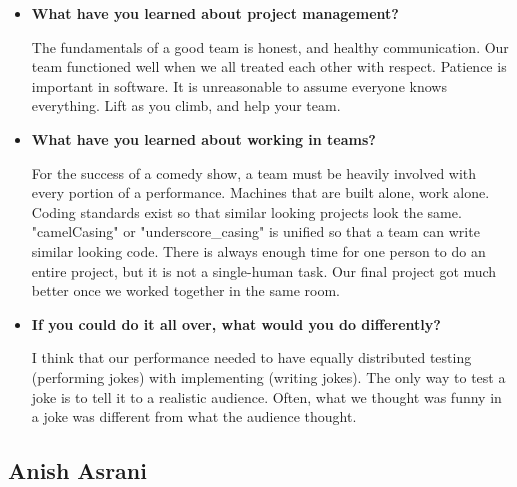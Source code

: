 \documentclass[onecolumn, draftclsnofoot,10pt, compsoc]{IEEEtran}
\begin{document}
\begin{itemize}
\item{\textbf{What have you learned about project management?}}

    The fundamentals of a good team is honest, and healthy communication.
    Our team functioned well when we all treated each other with respect.
    Patience is important in software. It is unreasonable to assume everyone knows everything.
    Lift as you climb, and help your team.


\item{\textbf{What have you learned about working in teams?}}

        For the success of a comedy show, a team must be heavily involved with every portion of a performance.
        Machines that are built alone, work alone. Coding standards exist so that similar looking projects look the same.
        "camelCasing" or "underscore\_casing" is unified so that a team can write similar looking code.
        There is always enough time for one person to do an entire project, but it is not a single-human task.
        Our final project got much better once we worked together in the same room.


\item{\textbf{If you could do it all over, what would you do differently?}}

    I think that our performance needed to have equally distributed testing (performing jokes) with implementing (writing jokes).
	 The only way to test a joke is to tell it to a realistic audience.
	 Often, what we thought was funny in a joke was different from what the audience thought.
	 
	 \end{itemize}







\pagebreak

\subsection{Anish Asrani}
\end{document}
